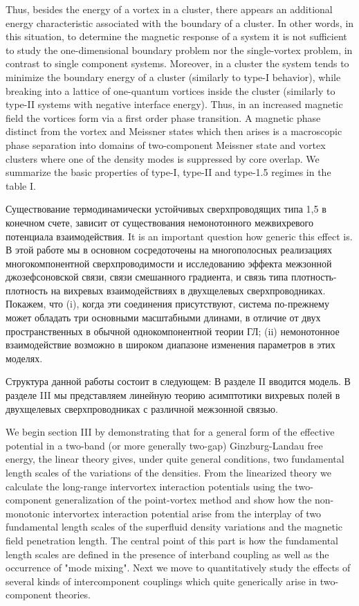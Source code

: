 Thus, besides the energy of a vortex in a cluster, there appears an additional 
energy characteristic associated with the boundary of a cluster. In other 
words, in this situation, to determine the magnetic response of a system it is 
not sufficient to study the one-dimensional boundary problem nor the 
single-vortex problem, in contrast to single component systems. Moreover, in a 
cluster the system tends to minimize the boundary energy of a cluster 
(similarly to type-I behavior), while breaking into a lattice of one-quantum 
vortices inside the cluster (similarly to type-II systems with negative 
interface energy). Thus, in an increased magnetic field the vortices form via 
a first order phase transition. A magnetic phase distinct from the vortex and 
Meissner states which then arises is a macroscopic phase separation into 
domains of two-component Meissner state and vortex clusters where one of the 
density modes is suppressed by core overlap. We summarize the basic properties 
of type-I, type-II and type-1.5 regimes in the table I.

Существование термодинамически устойчивых сверхпроводящих типа 1,5 в конечном 
счете, зависит от существования немонотонного межвихревого потенциала 
взаимодействия. It is an important question how generic this effect is. В этой 
работе мы в основном сосредоточены на многополосных реализациях 
многокомпонентной сверхпроводимости и исследованию эффекта межзонной 
джозефсоновской связи, связи смешанного градиента, и связь типа 
плотность-плотность на вихревых взаимодействиях в двухщелевых сверхпроводниках. 
Покажем, что (i), когда эти соединения присутствуют, система по-прежнему может 
обладать три основными масштабными длинами, в отличие от двух пространственных 
в обычной однокомпонентной теории ГЛ; (ii) немонотонное взаимодействие 
возможно в широком диапазоне изменения параметров в этих моделях.

Структура данной работы состоит в следующем: В разделе II вводится модель. 
В разделе III мы представляем линейную теорию асимптотики вихревых полей в 
двухщелевых сверхпроводниках с различной межзонной связью.

We begin section III by demonstrating that for a general form of the effective 
potential in a two-band (or more generally two-gap) Ginzburg-Landau free 
energy, the linear theory gives, under quite general conditions, two 
fundamental length scales of the variations of the densities. From the 
linearized theory we calculate the long-range intervortex interaction 
potentials using the two-component generalization of the point-vortex method 
\cite{bib:19} and show how the non-monotonic intervortex interaction potential 
arise from the interplay of two fundamental length scales of the superfluid 
density variations and the magnetic field penetration length. The central 
point of this part is how the fundamental length scales are defined in the 
presence of interband coupling as well as the occurrence of "mode mixing". 
Next we move to quantitatively study the effects of several kinds of 
intercomponent couplings which quite generically arise in two-component 
theories.


